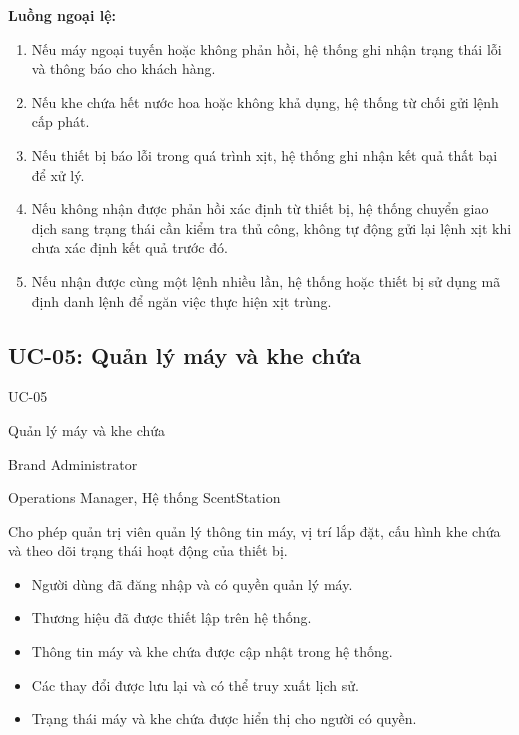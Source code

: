 \textbf{Luồng ngoại lệ:}
\begin{enumerate}[label=\arabic{enumi}a*.]
    \item Nếu máy ngoại tuyến hoặc không phản hồi, hệ thống ghi nhận trạng thái lỗi và thông báo cho khách hàng.
    \item Nếu khe chứa hết nước hoa hoặc không khả dụng, hệ thống từ chối gửi lệnh cấp phát.
    \item Nếu thiết bị báo lỗi trong quá trình xịt, hệ thống ghi nhận kết quả thất bại để xử lý.
    \item Nếu không nhận được phản hồi xác định từ thiết bị, hệ thống chuyển giao dịch sang trạng thái cần kiểm tra thủ công, không tự động gửi lại lệnh xịt khi chưa xác định kết quả trước đó.
    \item Nếu nhận được cùng một lệnh nhiều lần, hệ thống hoặc thiết bị sử dụng mã định danh lệnh để ngăn việc thực hiện xịt trùng.
\end{enumerate}

\subsection{UC-05: Quản lý máy và khe chứa}

\begin{description}[leftmargin=3.5cm,style=nextline]
    \item[Mã Use Case:] UC-05
    \item[Tên Use Case:] Quản lý máy và khe chứa
    \item[Tác nhân chính:] Brand Administrator
    \item[Tác nhân liên quan:] Operations Manager, Hệ thống ScentStation
    \item[Mục tiêu:] Cho phép quản trị viên quản lý thông tin máy, vị trí lắp đặt, cấu hình khe chứa và theo dõi trạng thái hoạt động của thiết bị.
    \item[Tiền điều kiện:]
    \begin{itemize}
        \item Người dùng đã đăng nhập và có quyền quản lý máy.
        \item Thương hiệu đã được thiết lập trên hệ thống.
    \end{itemize}
    \item[Hậu điều kiện:]
    \begin{itemize}
        \item Thông tin máy và khe chứa được cập nhật trong hệ thống.
        \item Các thay đổi được lưu lại và có thể truy xuất lịch sử.
        \item Trạng thái máy và khe chứa được hiển thị cho người có quyền.
    \end{itemize}
\end{description}

